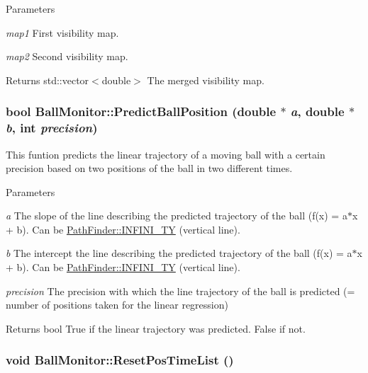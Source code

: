 \begin{DoxyParams}{Parameters}
\item[{\em map1}]First visibility map. \item[{\em map2}]Second visibility map. \end{DoxyParams}
\begin{DoxyReturn}{Returns}
std::vector$<$double$>$ The merged visibility map. 
\end{DoxyReturn}
\hypertarget{classBallMonitor_a914053314023ea79ee691a3031e355bf}{
\subsubsection[{PredictBallPosition}]{\setlength{\rightskip}{0pt plus 5cm}bool BallMonitor::PredictBallPosition (double $\ast$ {\em a}, \/  double $\ast$ {\em b}, \/  int {\em precision})}}
\label{classBallMonitor_a914053314023ea79ee691a3031e355bf}


This funtion predicts the linear trajectory of a moving ball with a certain precision based on two positions of the ball in two different times. 


\begin{DoxyParams}{Parameters}
\item[{\em a}]The slope of the line describing the predicted trajectory of the ball (f(x) = a$\ast$x + b). Can be \hyperlink{classPathFinder_a341ee3901465d58e8aad2fc0dd227168}{PathFinder::INFINI\_\-TY} (vertical line). \item[{\em b}]The intercept the line describing the predicted trajectory of the ball (f(x) = a$\ast$x + b). Can be \hyperlink{classPathFinder_a341ee3901465d58e8aad2fc0dd227168}{PathFinder::INFINI\_\-TY} (vertical line). \item[{\em precision}]The precision with which the line trajectory of the ball is predicted (= number of positions taken for the linear regression) \end{DoxyParams}
\begin{DoxyReturn}{Returns}
bool True if the linear trajectory was predicted. False if not. 
\end{DoxyReturn}
\hypertarget{classBallMonitor_a09ed61cf1852d45f03e7aacdebfe0175}{
\subsubsection[{ResetPosTimeList}]{\setlength{\rightskip}{0pt plus 5cm}void BallMonitor::ResetPosTimeList ()}}
\label{classBallMonitor_a09ed61cf1852d45f03e7aacdebfe0175}


